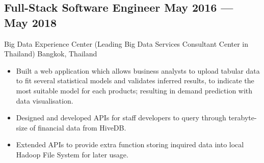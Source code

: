 \documentclass{article}
\newcommand{\subtext}[1]{
#1\par\vspace{-0.2cm}}
\newenvironment{zitemize}{
\begin{itemize}\itemsep0pt \parskip0pt \parsep1pt}
{\end{itemize}\vspace{-0.5cm}}
\begin{document}
        \subsection*{Full-Stack Software Engineer \hfill May 2016 --- May 2018} 
        \subtext{Big Data Experience Center {\scriptsize (Leading Big Data Services Consultant Center in Thailand)} \hfill Bangkok, Thailand} 
            \vspace{0.1cm}
            \begin{zitemize}
                \item Built a web application which allows business analysts to upload tabular data to fit several statistical models and validates inferred results, to indicate the most suitable model for each products; resulting in demand prediction with data visualisation.
                \item Designed and developed APIs for staff developers to query through terabyte-size of financial data from HiveDB.
                \item Extended APIs to provide extra function storing inquired data into local Hadoop File System for later usage.
            \end{zitemize}


        
\end{document}
